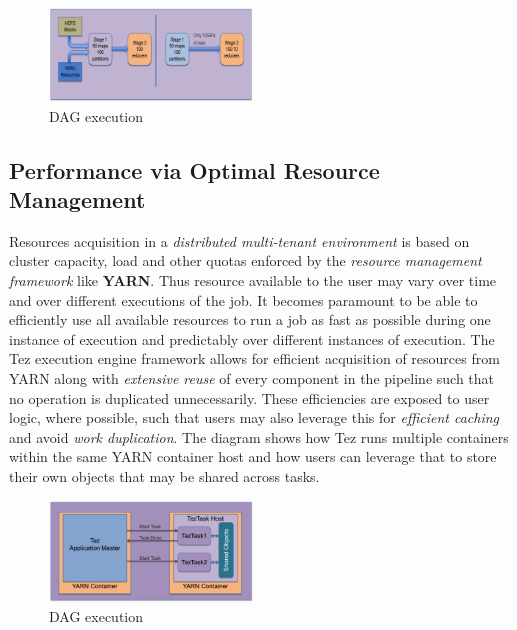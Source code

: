 \documentclass[twocolumn]{article}
\begin{document}
\begin{figure}[htb]
        \centering
        \includegraphics[width=0.48\textwidth]{tez3}
        \caption{DAG execution}
        \label{fig05}
\end{figure}

\subsection{Performance via Optimal Resource Management}

Resources acquisition in a \emph{distributed multi-tenant environment}
is based on cluster capacity, load and other quotas enforced by the
\emph{resource management framework} like \textbf{YARN}. Thus resource
available to the user may vary over time and over different executions
of the job. It becomes paramount to be able to efficiently use all
available resources to run a job as fast as possible during one instance
of execution and predictably over different instances of execution. The
Tez execution engine framework allows for efficient acquisition of
resources from YARN along with \emph{extensive reuse} of every component
in the pipeline such that no operation is duplicated unnecessarily.
These efficiencies are exposed to user logic, where possible, such that
users may also leverage this for \emph{efficient caching} and avoid
\emph{work duplication}. The diagram shows how Tez runs multiple
containers within the same YARN container host and how users can
leverage that to store their own objects that may be shared across
tasks.

\begin{figure}[htb]
        \centering
        \includegraphics[width=0.48\textwidth]{tez4}
        \caption{DAG execution}
        \label{fig06}
\end{figure}


\end{document}
